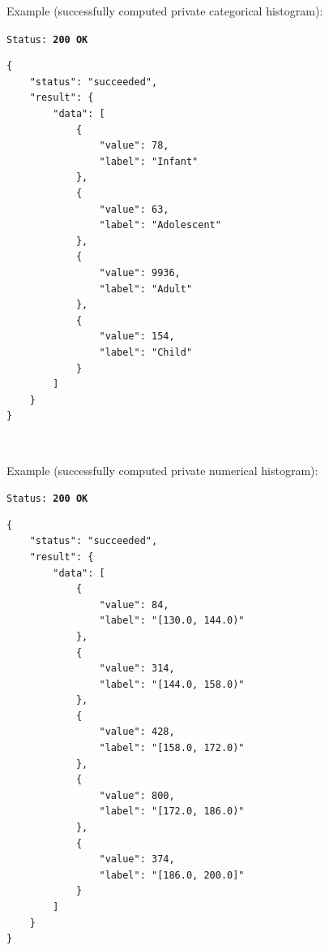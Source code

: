 \begin{itemize}
\begin{description}[labelwidth=4em, leftmargin=\dimexpr\labelwidth+\labelsep\relax]
\begin{minipage}{\linewidth}
  Example (successfully computed private categorical histogram):\\
{
\texttt{Status: {\color{ForestGreen}\textbf{200 OK}}}
\begin{verbatim}
{
    "status": "succeeded",
    "result": {
        "data": [
            {
                "value": 78,
                "label": "Infant"
            },
            {
                "value": 63,
                "label": "Adolescent"
            },
            {
                "value": 9936,
                "label": "Adult"
            },
            {
                "value": 154,
                "label": "Child"
            }
        ]
    }
}
\end{verbatim}
\label{sc:get-response-sucessful-1}
}
\end{minipage}
\ \\
\begin{minipage}{\linewidth}
  Example (successfully computed private numerical histogram):\\
{
\texttt{Status: {\color{ForestGreen}\textbf{200 OK}}}
\begin{verbatim}
{
    "status": "succeeded",
    "result": {
        "data": [
            {
                "value": 84,
                "label": "[130.0, 144.0)"
            },
            {
                "value": 314,
                "label": "[144.0, 158.0)"
            },
            {
                "value": 428,
                "label": "[158.0, 172.0)"
            },
            {
                "value": 800,
                "label": "[172.0, 186.0)"
            },
            {
                "value": 374,
                "label": "[186.0, 200.0]"
            }
        ]
    }
}
\end{verbatim}
\label{sc:get-response-sucessful-2}
}
\end{minipage}


\end{description}
\end{itemize}
